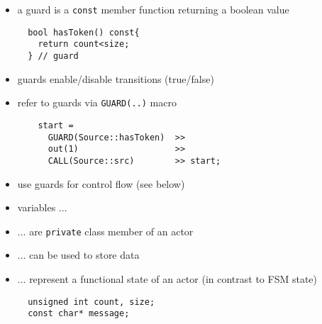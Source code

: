 \begin{frame}[fragile=singleslide]
\begin{itemize}
\item a guard is a \lstinline!const! member function returning a boolean value
\begin{lstlisting}
  bool hasToken() const{
    return count<size;
  } // guard
\end{lstlisting}
\item guards enable/disable transitions (true/false)
\item refer to guards via \lstinline!GUARD(..)! macro 
\begin{lstlisting}
    start = 
      GUARD(Source::hasToken)  >>
      out(1)                   >>
      CALL(Source::src)        >> start;
\end{lstlisting}
\item use guards for control flow (see below)
\end{itemize}
\end{frame}







\begin{frame}[fragile=singleslide]
\begin{itemize}
\item variables ...
\item ... are \lstinline!private! class member of an actor
\item ... can be used to store data
\item ... represent a functional state of an actor (in contrast to FSM state)
\begin{lstlisting}
  unsigned int count, size;
  const char* message;
\end{lstlisting}
\end{itemize}
\end{frame}






